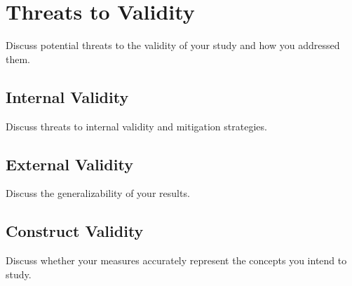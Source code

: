 \section{Threats to Validity}
\label{sec:threats}

Discuss potential threats to the validity of your study and how you addressed them.

\subsection{Internal Validity}
\label{subsec:internal}

Discuss threats to internal validity and mitigation strategies.


\subsection{External Validity}
\label{subsec:external}

Discuss the generalizability of your results.


\subsection{Construct Validity}
\label{subsec:construct}

Discuss whether your measures accurately represent the concepts you intend to study.

